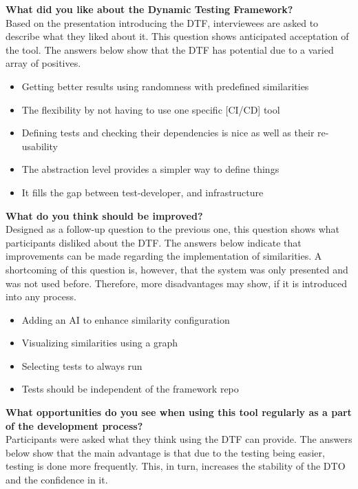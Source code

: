\textbf{What did you like about the Dynamic Testing Framework?}\\
Based on the presentation introducing the DTF, interviewees are asked to describe what they liked about it.
This question shows anticipated acceptation of the tool.
The answers below show that the DTF has potential due to a varied array of positives.

\begin{itemize}
    \item Getting better results using randomness with predefined similarities
    \item The flexibility by not having to use one specific [CI/CD] tool
    \item Defining tests and checking their dependencies is nice as well as their re-usability
    \item The abstraction level provides a simpler way to define things
    \item It fills the gap between test-developer, and infrastructure
\end{itemize}

\textbf{What do you think should be improved?}\\
Designed as a follow-up question to the previous one, this question shows what participants disliked about the DTF.
The answers below indicate that improvements can be made regarding the implementation of similarities.
A shortcoming of this question is, however, that the system was only presented and was not used before.
Therefore, more disadvantages may show, if it is introduced into any process.

\begin{itemize}
    \item Adding an AI to enhance similarity configuration
    \item Visualizing similarities using a graph
    \item Selecting tests to always run
    \item Tests should be independent of the framework repo
\end{itemize}

\textbf{What opportunities do you see when using this tool regularly as a part of the development process?}\\
Participants were asked what they think using the DTF can provide.
The answers below show that the main advantage is that due to the testing being easier, testing is done more frequently.
This, in turn, increases the stability of the DTO and the confidence in it.

